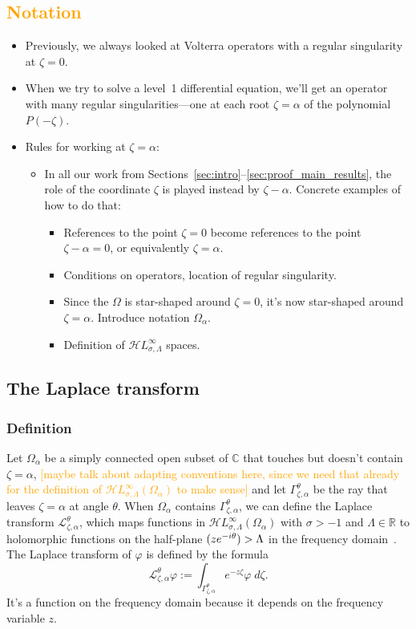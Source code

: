 \documentclass{article}
\theoremstyle{plain}
\newcommand{\R}{\mathbb{R}}
\newcommand{\C}{\mathbb{C}}
\let\Re\relax
\DeclareMathOperator{\Re}{Re}
\newcommand{\laplace}{\mathcal{L}}
\newcommand{\singexp}[2]{\mathcal{H}L^\infty_{#1, #2}}
\newcommand{\domain}{\Omega}
\newenvironment{brainstorm}{\color{violet}\begin{itemize}}{\end{itemize}\color{black}}
\begin{document}
\subsection{\textcolor{orange}{Notation}}
\begin{brainstorm}
\item Previously, we always looked at Volterra operators with a regular singularity at $\zeta = 0$.
\item When we try to solve a level~1 differential equation, we'll get an operator with many regular singularities---one at each root $\zeta = \alpha$ of the polynomial $P(-\zeta)$.
\item Rules for working at $\zeta = \alpha$:
\begin{itemize}
    \item In all our work from Sections~\ref{sec:intro}--\ref{sec:proof_main_results}, the role of the coordinate $\zeta$ is played instead by $\zeta - \alpha$. Concrete examples of how to do that:
    \begin{itemize}
        \item References to the point $\zeta = 0$ become references to the point $\zeta - \alpha = 0$, or equivalently $\zeta = \alpha$.
        \item Conditions on operators, location of regular singularity.
        \item Since the $\domain$ is star-shaped around $\zeta = 0$, it's now star-shaped around $\zeta = \alpha$. Introduce notation $\domain_\alpha$.
        \item Definition of $\singexp{\sigma}{\Lambda}$ spaces.
    \end{itemize}
\end{itemize}
\end{brainstorm}
\subsection{The Laplace transform}
\subsubsection{Definition}
Let $\domain_\alpha$ be a simply connected open subset of $\C$ that touches but doesn't contain $\zeta=\alpha$, \textcolor{orange}{[maybe talk about adapting conventions here, since we need that already for the definition of $\singexp{\sigma}{\Lambda}(\domain_\alpha)$ to make sense]} and let $\Gamma_{\zeta, \alpha}^\theta$ be the ray that leaves $\zeta=\alpha$ at angle $\theta$. When $\domain_\alpha$ contains $\Gamma_{\zeta, \alpha}^\theta$, we can define the Laplace transform $\laplace_{\zeta, \alpha}^{\theta}$, which maps functions in $\singexp{\sigma}{\Lambda}(\domain_\alpha)$ with $\sigma>-1$ and $\Lambda\in\R$ to holomorphic functions on the half-plane $\Re(z e^{-i\theta}) > \Lambda$ in the frequency domain~\cite[Section 5.6]{diverg-resurg-i}. The Laplace transform of $\varphi$ is defined by the formula
\begin{equation}\label{laplace:int} 
\laplace_{\zeta, \alpha}^{\theta} \varphi := \int_{\Gamma_{\zeta,\alpha}^\theta} e^{-z\zeta} \varphi\;d\zeta.
\end{equation}
It's a function on the frequency domain because it depends on the frequency variable $z$.
\end{document}
